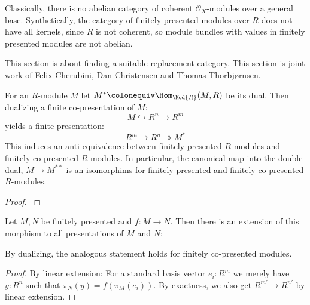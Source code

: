 

Classically, there is no abelian category of coherent $\mathcal O_X$-modules over a general base.
Synthetically, the category of finitely presented modules over $R$ does not have all kernels,
since $R$ is not coherent, so module bundles with values in finitely presented modules are not abelian.

This section is about finding a suitable replacement category.
This section is joint work of Felix Cherubini, Dan Christensen and Thomas Thorbjørnsen.

\begin{theorem}
  For an $R$-module $M$ let $M^\ast\colonequiv \Hom_{\Mod{R}}(M,R)$ be its dual.
  Then dualizing a finite co-presentation of $M$:
  \[ M \hookrightarrow R^n \to R^m \]
  yields a finite presentation:
  \[ R^m \to R^n \twoheadrightarrow M^\ast \]
  This induces an anti-equivalence between finitely presented $R$-modules and finitely co-presented $R$-modules. In particular, the canonical map into the double dual, $M\to M^{\ast\ast}$ is an isomorphims for finitely presented and finitely co-presented $R$-modules.
\end{theorem}

\begin{proof}
  \cite{diffgeo-article}
\end{proof}


\begin{lemma}
  \label{presentation-extension}
  Let $M,N$ be finitely presented and $f:M\to N$.
  Then there is an extension of this morphism to all presentations of $M$ and $N$:
  \begin{center}
  \end{center}
  By dualizing, the analogous statement holds for finitely co-presented modules.
\end{lemma}

\begin{proof}
  By linear extension: For a standard basis vector $e_i:R^m$ we merely have $y:R^n$ such that $\pi_N(y)=f(\pi_M(e_i))$. By exactness, we also get $R^{m'}\to R^{n'}$ by linear extension.
\end{proof}

